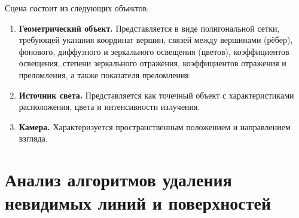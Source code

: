 %
%

Сцена состоит из следующих объектов:

\begin{enumerate}[label=\arabic*)]
	\item \textbf{Геометрический объект.} Представляется в виде полигональной сетки, требующей указания координат вершин, связей между вершинами (рёбер), фонового, диффузного и зеркального освещения (цветов), коэффициентов освещения, степени зеркального отражения, коэффициентов отражения и преломления, а также показателя преломления.
	\item \textbf{Источник света.} Представляется как точечный объект с характеристиками расположения, цвета и интенсивности излучения.
	\item \textbf{Камера.} Характеризуется пространственным положением и направлением взгляда.
\end{enumerate}

\section{Анализ алгоритмов удаления невидимых линий и поверхностей}

